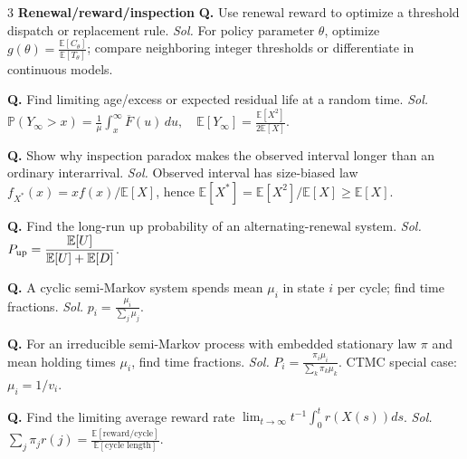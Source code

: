 \documentclass[a4paper,8pt,fleqn]{extarticle}
\newcommand{\E}{\mathbb{E}}
\newcommand{\PP}{\mathbb{P}}
\newcommand{\1}{\mathbf{1}}
\newcommand{\barF}{\overline{F}}
\newcommand{\sub}[1]{\textbf{#1} }
\newcommand{\probq}[2]{\textbf{Q.} #1 \emph{Sol.} #2\par}
\begin{document}
\begin{multicols}{3}
\sub{Renewal/reward/inspection}
\probq{Use renewal reward to optimize a threshold dispatch or replacement rule.}{For policy parameter \(\theta\), optimize \(\displaystyle g(\theta)=\frac{\E[C_\theta]}{\E[T_\theta]}\); compare neighboring integer thresholds or differentiate in continuous models.}
\probq{Find limiting age/excess or expected residual life at a random time.}{\(\displaystyle \PP(Y_\infty>x)=\frac1\mu\int_x^\infty \barF(u)\,du,\quad \E[Y_\infty]=\frac{\E[X^2]}{2\E[X]}\).}
\probq{Show why inspection paradox makes the observed interval longer than an ordinary interarrival.}{Observed interval has size-biased law \(f_{X^*}(x)=xf(x)/\E[X]\), hence \(\E[X^*]=\E[X^2]/\E[X]\ge \E[X]\).}
\probq{Find the long-run up probability of an alternating-renewal system.}{\(\displaystyle P_{\rm up}=\frac{\E[U]}{\E[U]+\E[D]}\).}
\probq{A cyclic semi-Markov system spends mean \(\mu_i\) in state \(i\) per cycle; find time fractions.}{\(\displaystyle p_i=\frac{\mu_i}{\sum_j\mu_j}\).}
\probq{For an irreducible semi-Markov process with embedded stationary law \(\pi\) and mean holding times \(\mu_i\), find time fractions.}{\(\displaystyle P_i=\frac{\pi_i\mu_i}{\sum_k\pi_k\mu_k}\). CTMC special case: \(\mu_i=1/v_i\).}
\probq{Find the limiting average reward rate \(\lim_{t\to\infty}t^{-1}\int_0^t r(X(s))ds\).}{\(\displaystyle \sum_j \pi_j r(j)=\frac{\E[\text{reward/cycle}]}{\E[\text{cycle length}]}\).}


\end{multicols}
\end{document}
